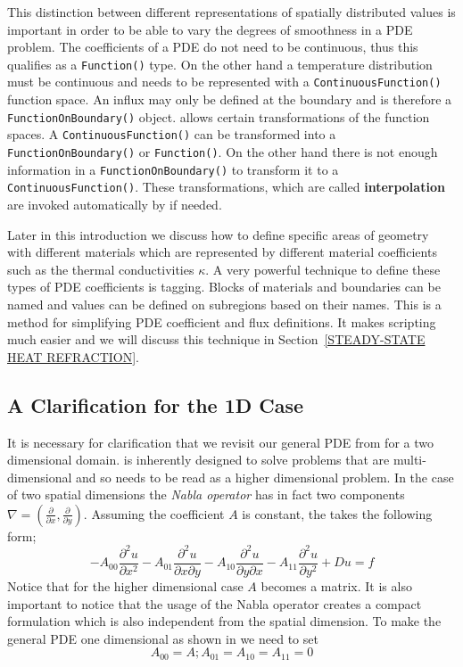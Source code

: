 This distinction between different representations of spatially distributed
values 
is important in order to be able to vary the degrees of smoothness in a PDE
problem. 
The coefficients of a PDE do not need to be continuous, thus this qualifies as a
\verb|Function()| type. 
On the other hand a temperature distribution must be continuous and needs to be
represented with a \verb|ContinuousFunction()| function space.
An influx may only be defined at the boundary and is therefore a
\verb|FunctionOnBoundary()| object.  
\esc allows certain transformations of the function spaces. A
\verb|ContinuousFunction()| can be transformed into a
\verb|FunctionOnBoundary()| or \verb|Function()|. On the other hand there is
not enough information in a \verb|FunctionOnBoundary()| to transform it to a
\verb|ContinuousFunction()|.
These transformations, which are called \textbf{interpolation} are invoked
automatically by \esc if needed.

Later in this introduction we discuss how
to define specific areas of geometry with different materials which are
represented by different material coefficients such as the
thermal conductivities $\kappa$. A very powerful technique to define these types
of PDE 
coefficients is tagging. Blocks of materials and boundaries can be named and
values can be defined on subregions based on their names.
This is a method for simplifying PDE coefficient and flux definitions. It makes
scripting much easier and we will discuss this technique in
Section~\ref{STEADY-STATE HEAT REFRACTION}.


\subsection{A Clarification for the 1D Case}
\label{SEC: 1D CLARIFICATION}
It is necessary for clarification that we revisit our general PDE from
 for a two dimensional domain. \esc is inherently
designed to solve problems that are multi-dimensional and so
 needs to be read as a higher dimensional problem.
In the case of two spatial dimensions the \textit{Nabla operator} has in fact
two components $\nabla = (\frac{\partial}{\partial x}, \frac{\partial}{\partial
y})$. Assuming the coefficient $A$ is constant, the 
takes the following form;
\begin{equation}\label{eqn:commonform2D}
-A_{00}\frac{\partial^{2}u}{\partial x^{2}} 
-A_{01}\frac{\partial^{2}u}{\partial x\partial y} 
-A_{10}\frac{\partial^{2}u}{\partial y\partial x} 
-A_{11}\frac{\partial^{2}u}{\partial y^{2}} 
+ Du = f
\end{equation}
Notice that for the higher dimensional case $A$ becomes a matrix. It is also
important to notice that the usage of the Nabla operator creates
a compact formulation which is also independent from the spatial dimension. 
To make the general PDE  one dimensional as
shown in  we need to set
\begin{equation}
A_{00}=A; A_{01}=A_{10}=A_{11}=0
\end{equation}


